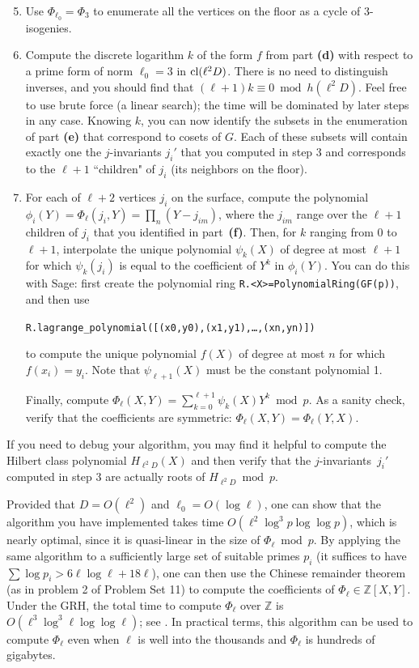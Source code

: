 \documentclass[11pt]{article}
\newcommand{\Z}{\mathbb{Z}}
\newcommand{\cl}{{\rm cl}}
\theoremstyle{definition}
\begin{document}
\begin{enumerate}[{\bf (a)}]
\setcounter{enumi}{4}
\item Use $\Phi_{\ell_0} = \Phi_3$ to enumerate all the vertices on the floor as a cycle of 3-isogenies.
\item Compute the discrete logarithm $k$ of the form $f$ from part \textbf{(d)} with respect to a prime form of norm $\ell_0=3$ in $\cl(\ell^2 D)$.
There is no need to distinguish inverses, and you should find that $(\ell+1)k\equiv 0\bmod h(\ell^2D)$.
Feel free to use brute force (a linear search); the time will be dominated by later steps in any case.
Knowing $k$, you can now identify the subsets in the enumeration of part \textbf{(e)} that correspond to cosets of $G$.
Each of these subsets will contain exactly one the $j$-invariants $j_i'$ that you computed in step 3 and corresponds to the  $\ell+1$ ``children" of $j_i$ (its neighbors on the floor).
\item For each of $\ell+2$ vertices $j_i$ on the surface, compute the polynomial $\phi_i(Y)=\Phi_\ell(j_i,Y)=\prod_n (Y-j_{im})$, where the $j_{im}$ range over the $\ell+1$ children of $j_i$ that you identified in part~\textbf{(f)}.
Then, for $k$ ranging from $0$ to $\ell+1$,  interpolate the unique polynomial $\psi_k(X)$ of degree at most $\ell+1$ for which $\psi_k(j_i)$ is equal to the coefficient of $Y^k$ in $\phi_i(Y)$.  You can do this with Sage: first create the polynomial ring \texttt{R.<X>=PolynomialRing(GF(p))}, and then use
\begin{center}
\texttt{R.lagrange\_polynomial([(x0,y0),(x1,y1),\ldots,(xn,yn)])}
\end{center}
to compute the unique polynomial $f(X)$ of degree at most $n$ for which $f(x_i)=y_i$.   Note that $\psi_{\ell+1}(X)$ must be the constant polynomial 1.

Finally, compute $\Phi_\ell(X,Y)=\sum_{k=0}^{\ell+1}\psi_k(X)Y^k\bmod p$.
As a sanity check, verify that the coefficients are symmetric: $\Phi_\ell(X,Y)=\Phi_\ell(Y,X)$.
\end{enumerate}
If you need to debug your algorithm, you may find it helpful to compute the Hilbert class polynomial $H_{\ell^2D}(X)$  and then verify that the $j$-invariants~$j_i'$ computed in step 3 are actually roots of $H_{\ell^2D}\bmod p$.


Provided that $D = O(\ell^2)$ and $\ell_0=O(\log\ell)$, one can show that the algorithm you have implemented takes time $O(\ell^2\log^3p\log\log p)$, which is nearly optimal, since it is quasi-linear in the size of $\Phi_\ell\bmod p$.  By applying the same algorithm to a sufficiently large set of suitable primes $p_i$ (it suffices to have $\sum \log p_i > 6\ell\log\ell + 18\ell$), one can then use the Chinese remainder theorem (as in problem 2 of Problem Set 11) to compute the coefficients of $\Phi_\ell\in\Z[X,Y]$.  Under the GRH, the total time to compute $\Phi_\ell$ over $\Z$ is $O(\ell^3\log^3\ell\log\log\ell)$; see \cite{BLS}.  In practical terms, this algorithm can be used to compute $\Phi_\ell$ even when $\ell$ is well into the thousands and $\Phi_\ell$ is hundreds of gigabytes.
\bigskip
\end{document}
